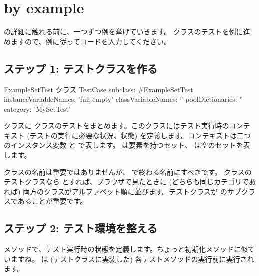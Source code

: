 \documentclass[a4paper,10pt,twoside]{book}
\begin{document}
\section{\sunit by example}

\SUnit の詳細に触れる前に、一つずつ例を挙げていきます。  クラスのテストを例に進めますので、例に従ってコードを入力してください。

\subsection{ステップ 1: テストクラスを作る}


\begin{classdef}[exampleSetTest]{ExampleSetTest クラス}
TestCase subclass: #ExampleSetTest
	instanceVariableNames: 'full empty'
	classVariableNames: ''
	poolDictionaries: ''
	category: 'MySetTest'
\end{classdef}

 クラスに  クラスのテストをまとめます。このクラスにはテスト実行時のコンテキスト (テストの実行に必要な状況、状態) を定義します。コンテキストは二つのインスタンス変数  と  で表します。  は要素を持つセット、  は空のセットを表します。

クラスの名前は重要ではありませんが、  で終わる名前にすべきです。  クラスのテストクラスなら  とすれば、ブラウザで見たときに (どちらも同じカテゴリであれば) 両方のクラスがアルファベット順に並びます。テストクラスが  のサブクラスであることが重要です。

\subsection{ステップ 2: テスト環境を整える}

 メソッドで、テスト実行時の状態を定義します。ちょっと初期化メソッドに似ていますね。  は (テストクラスに実装した) 各テストメソッドの実行前に実行されます。


\end{document}
